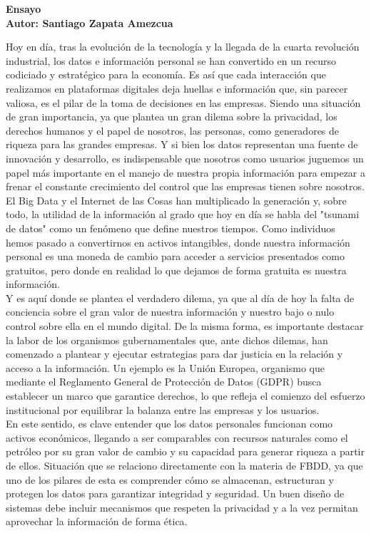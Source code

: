 \documentclass[12pt]{report}
\begin{document}
\begin{enumerate}[label=\textbf{\arabic*.}, leftmargin=*]
\newpage
\textbf{Ensayo\\
Autor: Santiago Zapata Amezcua}

Hoy en día, tras la evolución de la tecnología y la llegada de la cuarta revolución industrial, los datos e información personal se han convertido en un recurso codiciado y estratégico para la economía. Es así que cada interacción que realizamos en plataformas digitales deja huellas e información que, sin parecer valiosa, es el pilar de la toma de decisiones en las empresas. Siendo una situación de gran importancia, ya que plantea un gran dilema sobre la privacidad, los derechos humanos y el papel de nosotros, las personas, como generadores de riqueza para las grandes empresas. Y si bien los datos representan una fuente de innovación y desarrollo, es indispensable que nosotros como usuarios juguemos un papel más importante en el manejo de nuestra propia información para empezar a frenar el constante crecimiento del control que las empresas tienen sobre nosotros.\\

El Big Data y el Internet de las Cosas han multiplicado la generación y, sobre todo, la utilidad de la información al grado que hoy en día se habla del "tsunami de datos" como un fenómeno que define nuestros tiempos. Como individuos hemos pasado a convertirnos en activos intangibles, donde nuestra información personal es una moneda de cambio para acceder a servicios presentados como gratuitos, pero donde en realidad lo que dejamos de forma gratuita es nuestra información.\\

Y es aquí donde se plantea el verdadero dilema, ya que al día de hoy la falta de conciencia sobre el gran valor de nuestra información y nuestro bajo o nulo control sobre ella en el mundo digital. De la misma forma, es importante destacar la labor de los organismos gubernamentales que, ante dichos dilemas, han comenzado a plantear y ejecutar estrategias para dar justicia en la relación y acceso a la información. Un ejemplo es la Unión Europea, organismo que mediante el Reglamento General de Protección de Datos (GDPR) busca establecer un marco que garantice derechos, lo que refleja el comienzo del esfuerzo institucional por equilibrar la balanza entre las empresas y los usuarios.\\

En este sentido, es clave entender que los datos personales funcionan como activos económicos, llegando a ser comparables con recursos naturales como el petróleo por su gran valor de cambio y su capacidad para generar riqueza a partir de ellos. Situación que se relaciono directamente con la materia de FBDD, ya que uno de los pilares de esta es comprender cómo se almacenan, estructuran y protegen los datos para garantizar integridad y seguridad. Un buen diseño de sistemas debe incluir mecanismos que respeten la privacidad y a la vez permitan aprovechar la información de forma ética.\\


\end{enumerate}
\end{document}
